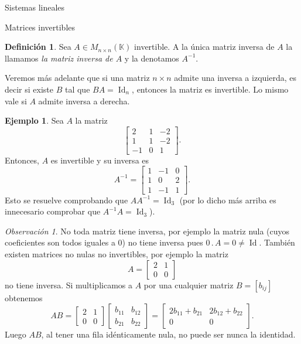 \documentclass[a4paper,12pt,twoside,spanish,reqno]{amsbook}
\theoremstyle{definition}
\newtheorem{definicion}{Definici\'on}[section]
\newtheorem{ejemplo}{Ejemplo}[section]
\theoremstyle{remark}
\newtheorem{observacion}{Observaci\'on}[section]
\newcommand{\Id}{\operatorname{Id}}
\newcommand{\K}{\mathbb K}
\begin{document}
\begin{chapter}{Sistemas lineales}
\begin{section}{Matrices invertibles}
			
			
			\begin{definicion}
				Sea $A\in M_{n\times n}(\K)$ invertible. A la única matriz inversa de $A$ la llamamos \textit{la matriz inversa de $A$} y la denotamos $A^{-1}$.
			\end{definicion}
			
			Veremos más adelante que si una matriz $n \times n$ admite una inversa a izquierda,  es decir si existe $B$ tal que $BA=\Id_n$, entonces la matriz es invertible. Lo mismo vale si $A$  admite inversa a derecha.
			
			\begin{ejemplo}
				Sea $A$ la matriz 
				\begin{equation*}
				\begin{bmatrix} 2&1&-2\\ 1&1&-2\\ -1&0&1
				\end{bmatrix}.
				\end{equation*}
				Entonces,  $A$ es invertible y su inversa es
				\begin{equation*}
				A^{-1} = \begin{bmatrix} 1&-1&0\\ 1&0&2\\ 1&-1&1
				\end{bmatrix}.
				\end{equation*}
				Esto se resuelve comprobando que $AA^{-1}=\Id_3$ (por lo dicho más arriba es innecesario comprobar que $A^{-1}A=\Id_3$).
			\end{ejemplo} 
			
			\begin{observacion}
				No toda matriz tiene inversa, por ejemplo  la  matriz nula (cuyos coeficientes son todos iguales a $0$) no tiene inversa pues $0\,.\, A= 0 \not= \Id$.  También existen matrices no nulas no invertibles,  por ejemplo la matriz 
				\begin{equation*}
				A = \begin{bmatrix} 2&1\\ 0&0\end{bmatrix}
				\end{equation*}
				no tiene inversa.
				Si  multiplicamos a $A$ por una cualquier matriz  $B =[b_{ij}]$ obtenemos
				\begin{equation*}
				AB = \begin{bmatrix} 2&1\\ 0&0\end{bmatrix}
				\begin{bmatrix} b_{11}&b_{12}\\ b_{21}&b_{22}\end{bmatrix} =
				\begin{bmatrix} 2b_{11}+b_{21}&2b_{12}+b_{22}\\0 &0\end{bmatrix}.
				\end{equation*}
				Luego $AB$, al tener una fila idénticamente nula, no puede ser nunca la identidad. 
			\end{observacion}
			

\end{section}
\end{chapter}
\end{document}
